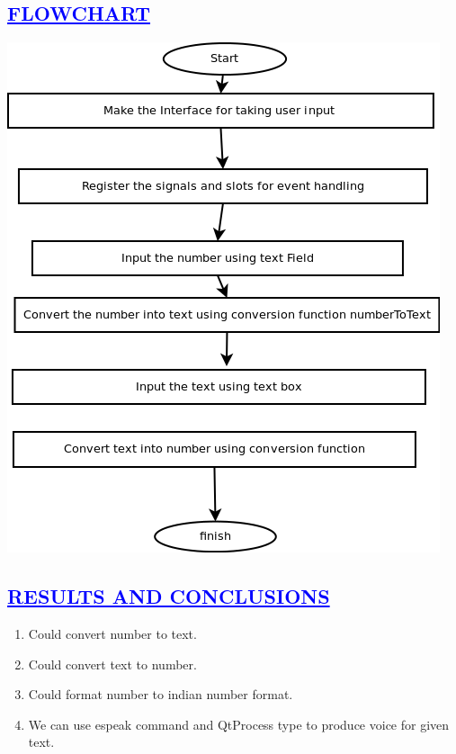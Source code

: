 \documentclass[a4paper,12pt]{report}
\begin{document}
\begin{center}
\begin{center}
\chapter{\textcolor{blue}{\underline {FLOWCHART}}}

\includegraphics[width=13 cm,height=12 cm]{flowchart.png}
\end{center}



\begin{center}

\chapter{\textcolor{blue}{\underline {RESULTS AND CONCLUSIONS}}}\end{center}
\begin{center}
\begin{enumerate}
\item Could convert number to text.
\item Could convert text to number.
\item Could format number to indian number format.
\item We can use espeak command and QtProcess type to produce voice for given text.
\begin{center}

\end{center}
\end{enumerate}
\end{center}
\end{center}
\end{document}
